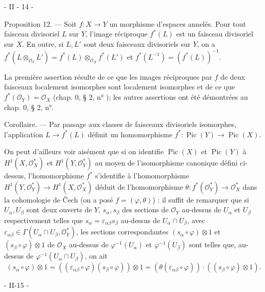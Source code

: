 \newpage


- II - 14 -

Proposition 12. — Soit $f : X \to Y$ un morphisme d'espaces annelés. Pour tout faisceau divisoriel $L$ sur $Y$, l'image réciproque $f^*(L)$ est un faisceau divisoriel sur $X$. En outre, si $L, L'$ sont deux faisceaux divisoriels sur $Y$, on a $f^*(L \otimes_{\mathcal{O}_Y} L') = f^*(L) \otimes_{\mathcal{O}_X} f^*(L')$ et $f^*(L^{-1}) = (f^*(L))^{-1}$.

La première assertion résulte de ce que les images réciproques par $f$ de deux faisceaux localement isomorphes sont localement isomorphes et de ce que $f^*(\mathcal{O}_Y) = \mathcal{O}_X$ (chap. 0, § 2, n° ); les autres assertions ont été démontrées au chap. 0, § 2, n°.

Corollaire. — Par passage aux classes de faisceaux divisoriels isomorphes, l'application $L \to f^*(L)$ définit un homomorphisme $f^* : \operatorname{Pic}(Y) \to \operatorname{Pic}(X)$.

On peut d'ailleurs voir aisément que si on identifie $\operatorname{Pic}(X)$ et $\operatorname{Pic}(Y)$ à $H^1(X, \mathcal{O}_X^*)$ et $H^1(Y, \mathcal{O}_Y^*)$ au moyen de l'isomorphisme canonique défini ci-dessus, l'homomorphisme $f^*$ s'identifie à l'homomorphisme $H^1(Y, \mathcal{O}_Y^*) \to H^1(X, \mathcal{O}_X^*)$ déduit de l'homomorphisme $\theta : f^*(\mathcal{O}_Y^*) \to \mathcal{O}_X^*$ dans la cohomologie de Čech (on a posé $f = (\varphi, \theta)$) : il suffit de remarquer que si $U_\alpha, U_\beta$ sont deux ouverts de $Y$, $s_\alpha, s_\beta$ des sections de $\mathcal{O}_Y$ au-dessus de $U_\alpha$ et $U_\beta$ respectivement telles que $s_\alpha = \varepsilon_{\alpha\beta} s_\beta$ au-dessus de $U_\alpha \cap U_\beta$, avec $\varepsilon_{\alpha\beta} \in \Gamma(U_\alpha \cap U_\beta, \mathcal{O}_Y^*)$, les sections correspondantes $(s_\alpha \circ \varphi) \otimes 1$ et $(s_\beta \circ \varphi) \otimes 1$ de $\mathcal{O}_X$ au-dessus de $\varphi^{-1}(U_\alpha)$ et $\varphi^{-1}(U_\beta)$ sont telles que, au-dessus de $\varphi^{-1}(U_\alpha \cap U_\beta)$, on ait
$$(s_\alpha \circ \varphi) \otimes 1 = ((\varepsilon_{\alpha\beta} \circ \varphi) (s_\beta \circ \varphi)) \otimes 1 = (\theta(\varepsilon_{\alpha\beta} \circ \varphi)) \cdot ((s_\beta \circ \varphi) \otimes 1).$$

\newpage


- II-15 -

